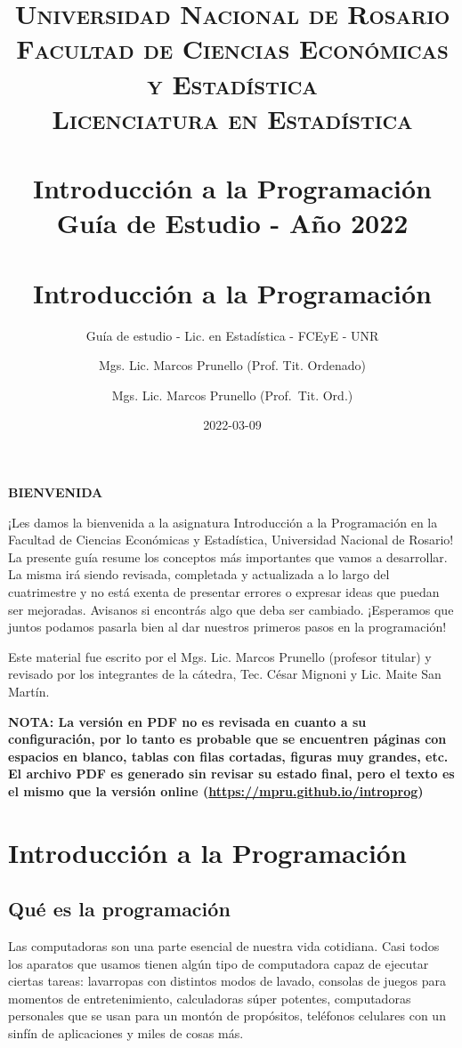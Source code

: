 \documentclass[
]{book}
\title{
	\usefont{OT1}{bch}{b}{n}
	\normalfont \normalsize
	\textsc{
		Universidad Nacional de Rosario \\
		Facultad de Ciencias Económicas y Estadística \\
		Licenciatura en Estadística
	} \\ [25pt]
	\horrule{2pt} \\[0.4cm]
	\huge \textbf{Introducción a la Programación} \\
	\bigbreak
	Guía de Estudio - Año 2022\\
	\horrule{2pt} \\[0.5cm]}
\author{
	\normalfont Mgs. Lic. Marcos Prunello (Prof. Tit. Ordenado)
}
\title{Introducción a la Programación}
\subtitle{Guía de estudio - Lic. en Estadística - FCEyE - UNR}
\author{Mgs. Lic. Marcos Prunello (Prof.~Tit. Ord.)}
\date{2022-03-09}
\begin{document}
\maketitle

{
\setcounter{tocdepth}{1}
\tableofcontents
}
\newpage

\textbf{BIENVENIDA}

\vspace{\baselineskip}

¡Les damos la bienvenida a la asignatura Introducción a la Programación en la Facultad de Ciencias Económicas y Estadística, Universidad Nacional de Rosario! La presente guía resume los conceptos más importantes que vamos a desarrollar. La misma irá siendo revisada, completada y actualizada a lo largo del cuatrimestre y no está exenta de presentar errores o expresar ideas que puedan ser mejoradas. Avisanos si encontrás algo que deba ser cambiado. ¡Esperamos que juntos podamos pasarla bien al dar nuestros primeros pasos en la programación!

\vspace{\baselineskip}

Este material fue escrito por el Mgs. Lic. Marcos Prunello (profesor titular) y revisado por los integrantes de la cátedra, Tec. César Mignoni y Lic. Maite San Martín.

\vspace{\baselineskip}

\textbf{NOTA: La versión en PDF no es revisada en cuanto a su configuración, por lo tanto es probable que se encuentren páginas con espacios en blanco, tablas con filas cortadas, figuras muy grandes, etc. El archivo PDF es generado sin revisar su estado final, pero el texto es el mismo que la versión online (\url{https://mpru.github.io/introprog})}

\hypertarget{introducciuxf3n-a-la-programaciuxf3n}{%
\chapter{Introducción a la Programación}\label{introducciuxf3n-a-la-programaciuxf3n}}

\hypertarget{quuxe9-es-la-programaciuxf3n}{%
\section{Qué es la programación}\label{quuxe9-es-la-programaciuxf3n}}

Las computadoras son una parte esencial de nuestra vida cotidiana. Casi todos los aparatos que usamos tienen algún tipo de computadora capaz de ejecutar ciertas tareas: lavarropas con distintos modos de lavado, consolas de juegos para momentos de entretenimiento, calculadoras súper potentes, computadoras personales que se usan para un montón de propósitos, teléfonos celulares con un sinfín de aplicaciones y miles de cosas más.
\end{document}
